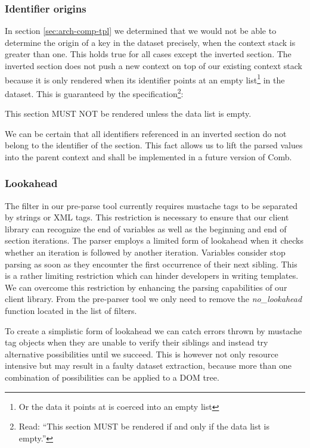 \documentclass[thesis.tex]{subfiles}
\begin{document}
\subsubsection{Identifier origins}
In section \ref{sec:arch-comp-tpl} we determined that we would not be able to
determine the origin of a key in the dataset precisely, when the context
stack is greater than one. This holds true for all cases except the inverted
section. The inverted section does not push a new context on top of our existing
context stack because it is only rendered when its identifier points at an empty
list\footnote{
	Or the data it points at is coerced into an empty list
} in the dataset. This is guaranteed by the specification\footnote{
	Read: ``This section MUST be rendered if and only if the data list is empty.''
}:
\begin{citequote}{\cite[inverted.yml]{MSTSPEC}}
This section MUST NOT be rendered unless the data list is empty.
\end{citequote}
We can be certain that all identifiers referenced in an inverted section do not
belong to the identifier of the section. This fact allows us to lift the parsed
values into the parent context and shall be implemented in a future version of
Comb.

\subsubsection{Lookahead}
\label{sec:lookahead}
The filter in our pre-parse tool currently requires mustache tags to be
separated by strings or XML tags. This restriction is necessary to ensure that
our client library can recognize the end of variables as well as the beginning
and end of section iterations. The parser employs a limited form of lookahead
when it checks whether an iteration is followed by another iteration. Variables
consider stop parsing as soon as they encounter the first occurrence of their
next sibling. This is a rather limiting restriction which can hinder developers
in writing templates.
We can overcome this restriction by enhancing the parsing capabilities of our
client library. From the pre-parser tool we only need to remove the
\emph{no\_lookahead} function located in the list of filters.

To create a simplistic form of lookahead we can catch errors thrown by
mustache tag objects when they are unable to verify their siblings and instead
try alternative possibilities until we succeed. This is however not only
resource intensive but may result in a faulty dataset extraction, because more
than one combination of possibilities can be applied to a DOM tree.
\end{document}
